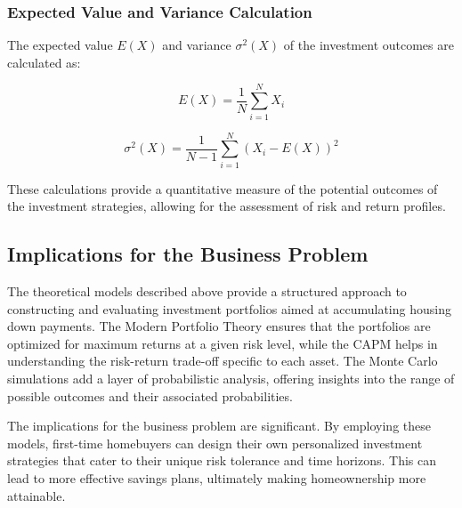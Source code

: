 \subsubsection{Expected Value and Variance Calculation}
The expected value \( E(X) \) and variance \( \sigma^2(X) \) of the investment outcomes are calculated as:

\[
E(X) = \frac{1}{N} \sum_{i=1}^{N} X_i
\]

\[
\sigma^2(X) = \frac{1}{N - 1} \sum_{i=1}^{N} (X_i - E(X))^2
\]

These calculations provide a quantitative measure of the potential outcomes of the investment strategies, allowing for the assessment of risk and return profiles.

\subsection{Implications for the Business Problem}
The theoretical models described above provide a structured approach to constructing and evaluating investment portfolios aimed at accumulating housing down payments. The Modern Portfolio Theory ensures that the portfolios are optimized for maximum returns at a given risk level, while the CAPM helps in understanding the risk-return trade-off specific to each asset. The Monte Carlo simulations add a layer of probabilistic analysis, offering insights into the range of possible outcomes and their associated probabilities.

The implications for the business problem are significant. By employing these models, first-time homebuyers can design their own personalized investment strategies that cater to their unique risk tolerance and time horizons. This can lead to more effective savings plans, ultimately making homeownership more attainable.















